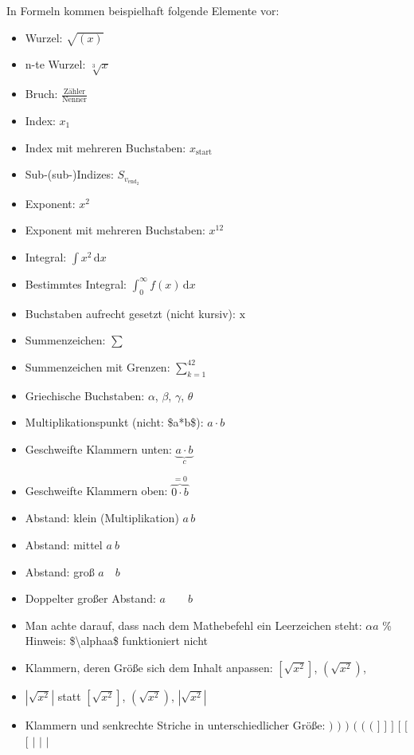 In Formeln kommen beispielhaft folgende Elemente vor:
\begin{itemize}
\item Wurzel: $\sqrt{\left(x\right)}$
\item n-te Wurzel: $\sqrt[3]{x}$
\item Bruch: $\frac{\text{Zähler}}{\text{Nenner}}$
\item Index: $x_{1}$
\item Index mit mehreren Buchstaben: $x_{\mathrm{start}}$
\item Sub-(sub-)Indizes: $S_{v_{\mathrm{end}_{2}}}$
\item Exponent: $x^{2}$
\item Exponent mit mehreren Buchstaben: $x^{12}$
\item Integral: $\int x^{2}\,\mathrm{d}x$ 
\item Bestimmtes Integral: $\int_{0}^{\infty}f(x)\,\mathrm{d}x$
\item Buchstaben aufrecht gesetzt (nicht kursiv): $\mathrm{x}$
\item Summenzeichen: $\sum$
\item Summenzeichen mit Grenzen: $\sum_{k=1}^{42}$
\item Griechische Buchstaben: $\alpha$, $\beta$, $\gamma$, $\theta$
\item Multiplikationspunkt (nicht: \$a{*}b\$): $a\cdot b$
\item Geschweifte Klammern unten: $\underbrace{a\cdot b}_{c}$
\item Geschweifte Klammern oben: $\overbrace{0\cdot b}^{=0}$
\item Abstand: klein (Multiplikation) $a\,b$
\item Abstand: mittel $a\ b$
\item Abstand: groß $a\quad b$
\item Doppelter großer Abstand: $a\qquad b$
\item Man achte darauf, dass nach dem Mathebefehl ein Leerzeichen steht:
$\alpha a$ \% Hinweis: \$\textbackslash alphaa\$ funktioniert nicht
\item Klammern, deren Größe sich dem Inhalt anpassen: $\left[\sqrt{x^{2}}\right]$,
$\left(\sqrt{x^{2}}\right)$, 
\item $\left|\sqrt{x^{2}}\right|$ statt $[\sqrt{x^{2}}]$, $(\sqrt{x^{2}})$,
$|\sqrt{x^{2}}|$
\item Klammern und senkrechte Striche in unterschiedlicher Größe: $\bigr)$
$\biggr)$ $\Biggr)$ $\bigl($ $\biggl($ $\Biggl($ $\bigr]$ $\biggr]$
$\Biggr]$ $\bigl[$ $\biggl[$ $\Biggl[$ $\bigr|$ $\biggr|$ $\Biggr|$ 

\end{itemize}
